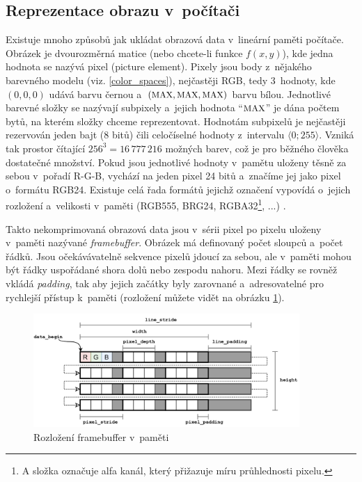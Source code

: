 \documentclass[11pt, a4paper, titlepage]{article}
\renewcommand{\uv}[1]{``#1''}
\begin{document}
\subsection{Reprezentace obrazu v~počítači}
Existuje mnoho způsobů jak ukládat obrazová data v~lineární paměti počítače.
Obrázek je dvourozměrná matice (nebo chcete-li funkce $f(x,y)$), kde jedna hodnota se nazývá pixel (picture element).
Pixely jsou body z~nějakého barevného modelu (viz. \ref{color_spaces}), nejčastěji RGB, tedy 3~hodnoty, kde $(0,0,0)$ udává barvu černou a~$(\text{\small MAX}, \text{\small MAX}, \text{\small MAX})$ barvu bílou.
Jednotlivé barevné složky se nazývají subpixely a~jejich hodnota \uv{$\text{\small MAX}$} je dána počtem bytů, na kterém složky chceme reprezentovat.
Hodnotám subpixelů je nejčastěji rezervován jeden bajt (8 bitů) čili celočíselné hodnoty z~intervalu $\langle0;255\rangle$.
Vzniká tak prostor čítající $256^3 = 16\,777\,216$ možných barev, což je pro běžného člověka dostatečné množství.
Pokud jsou jednotlivé hodnoty v~pamětu uloženy těsně za sebou v~pořadí R-G-B, vychází na jeden pixel 24 bitů a~značíme jej jako pixel o~formátu RGB24.
Existuje celá řada formátů jejichž označení vypovídá o~jejich rozložení a~velikosti v~paměti (RGB555, BRG24, RGBA32\footnote{A složka označuje alfa kanál, který přižazuje míru průhlednosti pixelu.}, ...) \cite{mul_opora}.

Takto nekomprimovaná obrazová data jsou v~sérii pixel po pixelu uloženy v~paměti nazývané \emph{framebuffer}.
Obrázek má definovaný počet sloupců a~počet řádků.
Jsou očekávávatelně sekvence pixelů jdoucí za sebou, ale v~paměti mohou být řádky uspořádané shora dolů nebo zespodu nahoru.
Mezi řádky se rovněž vkládá \emph{padding}, tak aby jejich začátky byly zarovnané a~adresovatelné pro rychlejší přístup k~paměti (rozložení můžete vidět na obrázku \ref{fig:framebuffer}).

\begin{figure}[h]
    \centering
    \includegraphics[width=0.9\textwidth]{framebuffer.png}
    \caption{Rozložení framebuffer v~paměti \cite{Whatdoes20:online}}
    \label{fig:framebuffer}
\end{figure}
\end{document}
